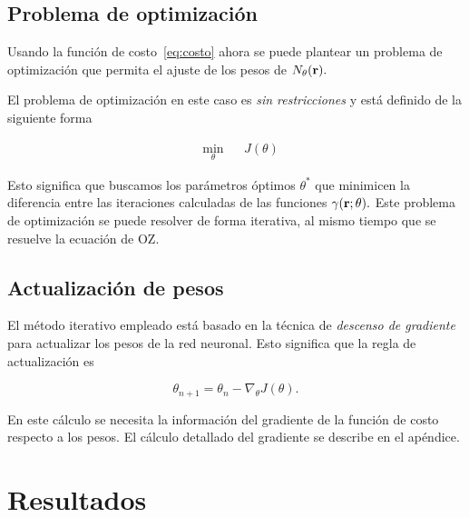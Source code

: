 \subsection{Problema de optimización}
Usando la función de costo~\eqref{eq:costo} ahora se puede plantear un problema de optimización
que permita el ajuste de los pesos de $N_{\theta}(\mathbf{r}).$

El problema de optimización en este caso es \emph{sin restricciones} y está
definido de la siguiente forma

\begin{equation}
    \begin{aligned}
    & \underset{\theta}{\text{min}}
    & & J(\theta)
    \end{aligned}
    \label{eq:optimizacion}
\end{equation}

Esto significa que buscamos los parámetros óptimos $\theta^*$ que minimicen la diferencia
entre las iteraciones calculadas de las funciones $\gamma(\mathbf{r}; \theta).$
Este problema de optimización se puede resolver de forma iterativa, al mismo tiempo que
se resuelve la ecuación de OZ.

\subsection{Actualización de pesos}
El método iterativo empleado está basado en la técnica de \emph{descenso de gradiente}
para actualizar los pesos de la red neuronal.
Esto significa que la regla de actualización es

\begin{equation}
    \theta_{n+1} = \theta_n - \nabla_{\theta} J(\theta) .
    \label{eq:gradiente}
\end{equation}

En este cálculo se necesita la información del gradiente de la función de costo respecto
a los pesos. El cálculo detallado del gradiente se describe en el apéndice.


\section{Resultados}

